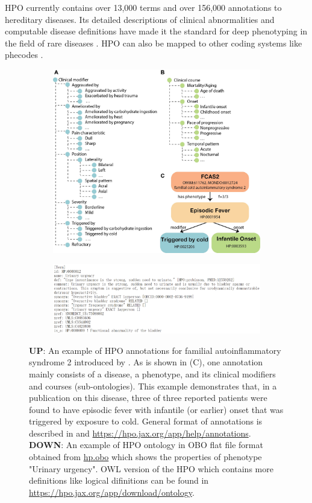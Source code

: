HPO currently contains over 13,000 terms and over 156,000 annotations to hereditary diseases. Its detailed descriptions of clinical abnormalities and computable disease definitions have made it the standard for deep phenotyping in the field of rare diseases \cite{hpo}. HPO can also be mapped to other coding systems like phecodes \cite{hpo,hpo-phecode}.
\begin{figure}[ht]
    \centering
    \begin{subfigure}[b]{0.9\textwidth}
      \includegraphics[width=\linewidth]{images/hpo annotation example.jpg}
    \end{subfigure}
    \begin{subfigure}[b]{0.9\textwidth}
      \includegraphics[width=\linewidth]{images/hpo ontology.png}
    \end{subfigure}    
    \caption{\textbf{UP}: An example of HPO annotations for familial autoinflammatory syndrome 2 introduced by \cite{hpo}. As is shown in (C), one annotation mainly consists of a disease, a phenotype, and its clinical modifiers and courses (sub-ontologies). This example demonstrates that, in a publication on this disease, three of three reported patients were found to have episodic fever with infantile (or earlier) onset that was triggered by exposure to cold. General format of annotations is described in \cite{hpo} and \url{https://hpo.jax.org/app/help/annotations}. \textbf{DOWN}: An example of HPO ontology in OBO flat file format obtained from \href{https://raw.githubusercontent.com/obophenotype/human-phenotype-ontology/master/hp.obo}{hp.obo} which shows the properties of phenotype "Urinary urgency". OWL version of the HPO which contains more definitions like logical difinitions can be found in \url{https://hpo.jax.org/app/download/ontology}.}

\end{figure}
